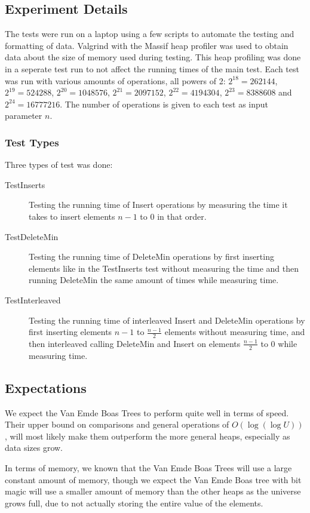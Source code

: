 \subsection{Experiment Details}
The tests were run on a laptop using a few scripts to automate the testing and formatting of data. Valgrind with the Massif heap profiler was used to obtain data about the size of memory used during testing. This heap profiling was done in a seperate test run to not affect the running times of the main test.
Each test was run with various amounts of operations, all powers of 2: $2^{18}=262144$, $2^{19}=524288$, $2^{20}=1048576$, $2^{21}=2097152$, $2^{22}=4194304$, $2^{23}=8388608$ and $2^{24}=16777216$. The number of operations is given to each test as input parameter $n$.

\subsubsection{Test Types}
Three types of test was done:
\begin{description}
\item[TestInserts] Testing the running time of Insert operations by measuring the time it takes to insert elements $n-1$ to $0$ in that order.
\item[TestDeleteMin] Testing the running time of DeleteMin operations by first inserting elements like in the TestInserts test without measuring the time and then running DeleteMin the same amount of times while measuring time.
\item[TestInterleaved] Testing the running time of interleaved Insert and DeleteMin operations by first inserting elements $n-1$ to $\frac{n-1}{2}$ elements without measuring time, and then interleaved calling DeleteMin and Insert on elements $\frac{n-1}{2}$ to $0$ while measuring time.
\end{description}



\subsection{Expectations}

We expect the Van Emde Boas Trees to perform quite well in terms of speed. Their upper bound on comparisons and general operations of $O(\log (\log U))$, will most likely  make them outperform the more general heaps, especially as data sizes grow.

In terms of memory, we known that the Van Emde Boas Trees will use a large constant amount of memory, though we expect the Van Emde Boas tree with bit magic will use a smaller amount of memory than the other heaps as the universe grows full, due to not actually storing the entire value of the elements.


